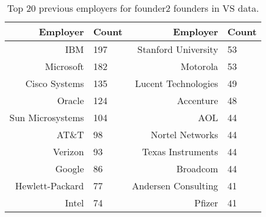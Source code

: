 \begin{table}[]
\centering
\begingroup\normalsize
\begin{tabular}{rlrl}
  \toprule
Employer & Count & Employer & Count \\ 
  \midrule
IBM & 197 & Stanford University & 53 \\ 
  Microsoft & 182 & Motorola & 53 \\ 
  Cisco Systems & 135 & Lucent Technologies & 49 \\ 
  Oracle & 124 & Accenture & 48 \\ 
  Sun Microsystems & 104 & AOL & 44 \\ 
  AT\&T & 98 & Nortel Networks & 44 \\ 
  Verizon & 93 & Texas Instruments & 44 \\ 
  Google & 86 & Broadcom & 44 \\ 
  Hewlett-Packard & 77 & Andersen Consulting & 41 \\ 
  Intel & 74 & Pfizer & 41 \\ 
   \bottomrule
\end{tabular}
\endgroup
\caption{Top 20 previous employers for founder2 founders in VS data.} 
\label{table:VS_previousEmployersNoPositionsSummaryTable}
\end{table}
